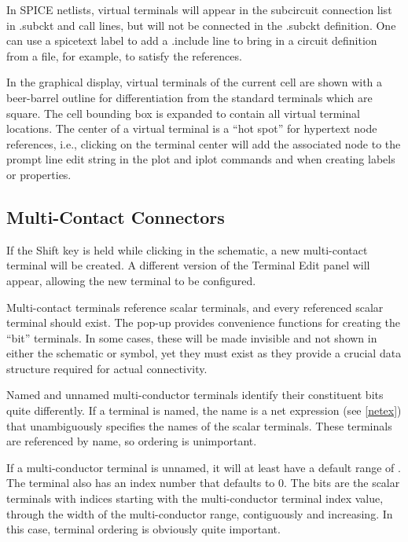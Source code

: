 In SPICE netlists, virtual terminals will appear in the subcircuit
connection list in {\vt .subckt} and call lines, but will not be
connected in the {\vt .subckt} definition.  One can use a {\vt
spicetext} label to add a {\vt .include} line to bring in a circuit
definition from a file, for example, to satisfy the references. 

In the graphical display, virtual terminals of the current cell are
shown with a beer-barrel outline for differentiation from the standard
terminals which are square.  The cell bounding box is expanded to
contain all virtual terminal locations.  The center of a virtual
terminal is a ``hot spot'' for hypertext node references, i.e.,
clicking on the terminal center will add the associated node to the
prompt line edit string in the {\cb plot} and {\cb iplot} commands and
when creating labels or properties.

\subsection{Multi-Contact Connectors}

If the {\kb Shift} key is held while clicking in the schematic,
a new multi-contact terminal will be created.  A different version
of the {\cb Terminal Edit} panel will appear, allowing the new terminal
to be configured.

Multi-contact terminals reference scalar terminals, and every
referenced scalar terminal should exist.  The pop-up provides
convenience functions for creating the ``bit'' terminals.  In some
cases, these will be made invisible and not shown in either the
schematic or symbol, yet they must exist as they provide a crucial
data structure required for actual connectivity.

Named and unnamed multi-conductor terminals identify their constituent
bits quite differently.  If a terminal is named, the name is a net
expression (see \ref{netex}) that unambiguously specifies the names of
the scalar terminals.  These terminals are referenced by name, so
ordering is unimportant.

If a multi-conductor terminal is unnamed, it will at least have a
default range of {\vt [0:0]}.  The terminal also has an index number
that defaults to 0.  The bits are the scalar terminals with indices
starting with the multi-conductor terminal index value, through the
width of the multi-conductor range, contiguously and increasing.  In
this case, terminal ordering is obviously quite important.

